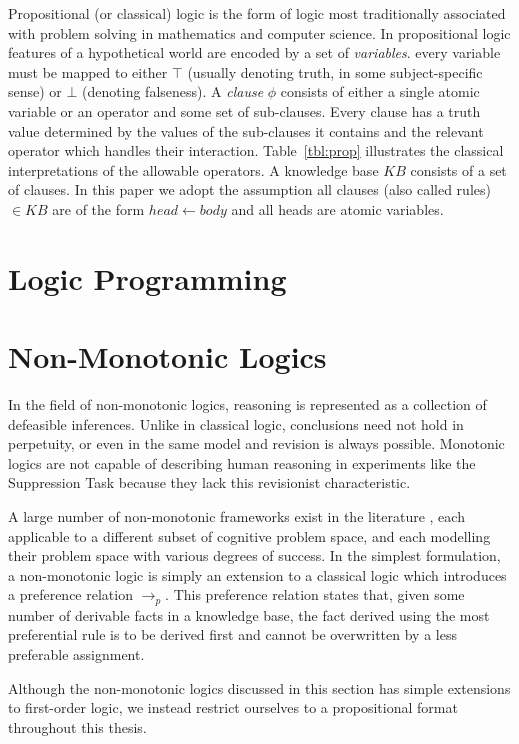 Propositional (or classical) logic is the form of logic most traditionally associated with problem solving in mathematics and computer science. In propositional logic features of a hypothetical world are encoded by a set of \textit{variables}. every variable must be mapped to either $\top$ (usually denoting truth, in some subject-specific sense) or $\bot$ (denoting falseness). A \textit{clause} $\phi$ consists of either a single atomic variable or an operator and some set of sub-clauses. Every clause has a truth value determined by the values of the sub-clauses it contains and the relevant operator which handles their interaction. Table~\ref{tbl:prop} illustrates the classical interpretations of the allowable operators. A knowledge base $KB$ consists of a set of clauses. In this paper we adopt the assumption all clauses (also called rules) $\in KB$ are of the form $head\leftarrow body$ and all heads are atomic variables.

\section{Logic Programming}

\section{Non-Monotonic Logics}
In the field of non-monotonic logics, reasoning is represented as a collection of defeasible inferences. Unlike in classical logic, conclusions need not hold in perpetuity, or even in the same model and revision is always possible. Monotonic logics are not capable of describing human reasoning in experiments like the Suppression Task \citep{dietz2012computational} because they lack this revisionist characteristic.

A large number of non-monotonic frameworks exist in the literature \citep{mcdermott1980non}, each applicable to a different subset of cognitive problem space, and each modelling their problem space with various degrees of success. In the simplest formulation, a non-monotonic logic is simply an extension to a classical logic which introduces a preference relation $\rightarrow_p$. This preference relation states that, given some number of derivable facts in a knowledge base, the fact derived using the most preferential rule is to be derived first and cannot be overwritten by a less preferable assignment.  

Although the non-monotonic logics discussed in this section has simple extensions to first-order logic, we instead restrict ourselves to a propositional format throughout this thesis.

